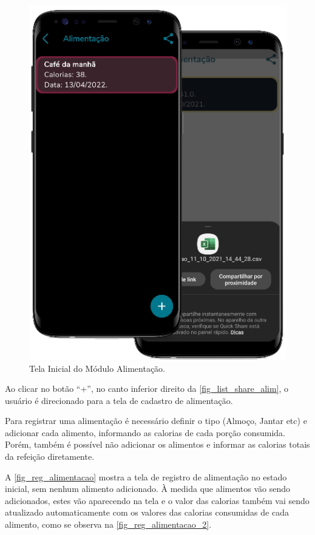 \begin{figure}[htb]
    \caption{\label{fig_list_share_alim}Tela Inicial do Módulo Alimentação.}
    \begin{center}
        \includegraphics[scale=0.72]{Imagens/desenvolvimento/app/list_share_alim.png}
    \end{center}
\end{figure}

Ao clicar no botão “+”, no canto inferior direito da \autoref{fig_list_share_alim}, o usuário é direcionado
para a tela de cadastro de alimentação.

Para registrar uma alimentação é necessário definir o tipo (Almoço, Jantar etc) e adicionar cada alimento,
informando as calorias de cada porção consumida. Porém, também é possível não adicionar os alimentos
e informar as calorias totais da refeição diretamente.

A \autoref{fig_reg_alimentacao} mostra a tela de registro de alimentação no estado inicial, sem nenhum alimento
adicionado. À medida que alimentos vão sendo adicionados, estes vão aparecendo na tela e o valor das calorias
também vai sendo atualizado automaticamente com os valores das calorias consumidas de cada alimento, como
se observa na \autoref{fig_reg_alimentacao_2}.

